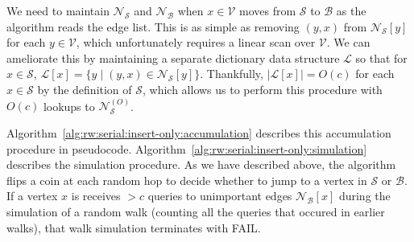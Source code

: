 \documentclass{report}
\begin{document}
We need to maintain $\mathcal{N}_\mathcal{S}$ and $\mathcal{N}_\mathcal{B}$ when $x \in \mathcal{V}$ moves from $\mathcal{S}$ to $\mathcal{B}$ as the algorithm reads the edge list. 
This is as simple as removing $(y, x)$ from $\mathcal{N}_\mathcal{S}[y]$ for each $y \in \mathcal{V}$, which unfortunately requires a linear scan over $\mathcal{V}$.
We can ameliorate this by maintaining a separate dictionary data structure $\mathcal{L}$ so that for $x \in \mathcal{S}$, $\mathcal{L}[x] = \{ y \mid (y, x) \in \mathcal{N}_\mathcal{S}[y] \}$.
Thankfully, $|\mathcal{L}[x]| = O(c)$ for each $x \in \mathcal{S}$ by the definition of $\mathcal{S}$, which allows us to perform this procedure with $O(c)$ lookups to $\mathcal{N}_\mathcal{S}^{(O)}$.

Algorithm~\ref{alg:rw:serial:insert-only:accumulation} describes this accumulation procedure in pseudocode. 
Algorithm~\ref{alg:rw:serial:insert-only:simulation} describes the simulation procedure.
As we have described above, the algorithm flips a coin at each random hop to decide whether to jump to a vertex in $\mathcal{S}$ or $\mathcal{B}$.
If a vertex $x$ is receives $> c$ queries to unimportant edges $\mathcal{N}_\mathcal{B}[x]$ during the simulation of a random walk (counting all the queries that occured in earlier walks), that walk simulation terminates with FAIL.
\end{document}
